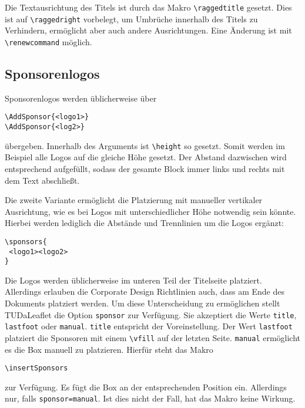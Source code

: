 \documentclass[
	color=3c,
	]{tudaleaflet}
\begin{document}
Die Textausrichtung des Titels ist durch das Makro \verb+\raggedtitle+ gesetzt. Dies ist auf \verb+\raggedright+ vorbelegt, um Umbrüche innerhalb des Titels zu Verhindern, ermöglicht aber auch andere Ausrichtungen. Eine Änderung ist mit \verb+\renewcommand+ möglich.

\subsection{Sponsorenlogos}
Sponsorenlogos werden üblicherweise über
\begin{verbatim}
\AddSponsor{<logo1>}
\AddSponsor{<log2>}
\end{verbatim}
übergeben. Innerhalb des Arguments ist \verb+\height+ so gesetzt. Somit werden im Beispiel alle Logos auf die gleiche Höhe gesetzt. Der Abstand dazwischen wird entsprechend aufgefüllt, sodass der gesamte Block immer links und rechts mit dem Text abschließt.

Die zweite Variante ermöglicht die Platzierung mit manueller vertikaler Ausrichtung, wie es bei Logos mit unterschiedlicher Höhe notwendig sein könnte. Hierbei werden lediglich die Abstände und Trennlinien um die Logos ergänzt:

\begin{verbatim}
\sponsors{
 <logo1><logo2>
}
\end{verbatim}

Die Logos werden üblicherweise im unteren Teil der Titelseite platziert. Allerdings erlauben die Corporate Design Richtlinien auch, dass am Ende des Dokuments platziert werden.
Um diese Unterscheidung zu ermöglichen stellt TUDaLeaflet die Option \verb+sponsor+ zur Verfügung. Sie akzeptiert die Werte \verb+title+, \verb+lastfoot+ oder \verb+manual+.
\verb+title+ entspricht der Voreinstellung. Der Wert \verb+lastfoot+ platziert die Sponsoren mit einem \verb+\vfill+ auf der letzten Seite. \verb+manual+ ermöglicht es die Box manuell zu platzieren. Hierfür steht das Makro
\begin{verbatim}
\insertSponsors
\end{verbatim}
zur Verfügung. Es fügt die Box an der entsprechenden Position ein. Allerdings nur, falls \verb+sponsor=manual+. Ist dies nicht der Fall, hat das Makro keine Wirkung.


\printbibliography
\end{document}
